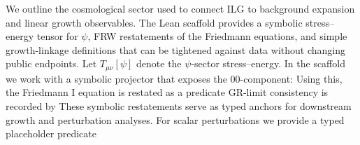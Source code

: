 \documentclass[aps,prd,twocolumn,superscriptaddress,nofootinbib,floatfix,longbibliography]{revtex4-2}
\newcommand{\lean}[1]{\texttt{\detokenize{#1}}}
\begin{document}
%
%
We outline the cosmological sector used to connect ILG to background expansion and linear growth observables. The Lean scaffold provides a symbolic stress--energy tensor for $\psi$, FRW restatements of the Friedmann equations, and simple growth-linkage definitions that can be tightened against data without changing public endpoints.
%
Let $T_{\mu\nu}[\psi]$ denote the $\psi$-sector stress--energy. In the scaffold we work with a symbolic projector that exposes the $00$-component:
Using this, the Friedmann I equation is restated as a predicate
GR-limit consistency is recorded by
These symbolic restatements serve as typed anchors for downstream growth and perturbation analyses.
%
For scalar perturbations we provide a typed placeholder predicate
\end{document}
